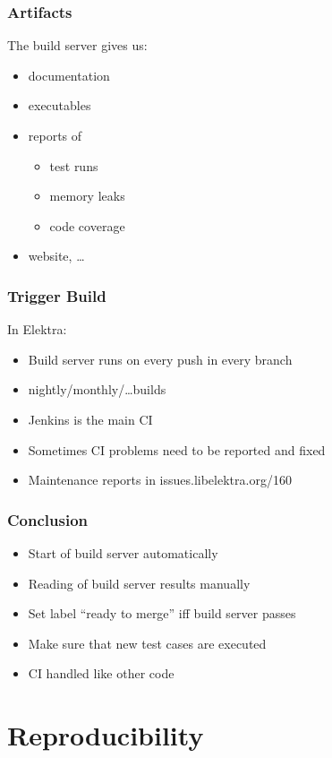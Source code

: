 \begin{frame}
	\frametitle{Artifacts}

	The build server gives us:

	\begin{itemize}[<+-| alert@+>]
	\item documentation
	\item executables
	\item reports of
	\begin{itemize}
	\item test runs
	\item memory leaks
	\item code coverage
	\end{itemize}
	\item website, \dots
	\end{itemize}
\end{frame}

\begin{frame}
	\frametitle{Trigger Build}

	In Elektra:
	\begin{itemize}[<+-| alert@+>]
	\item Build server runs on every push in every branch
	\item nightly/monthly/\dots builds
	\item Jenkins is the main CI
	\item Sometimes CI problems need to be reported and fixed
	\item Maintenance reports in issues.libelektra.org/160
	\end{itemize}
\end{frame}

\begin{frame}
	\frametitle{Conclusion}

	\begin{itemize}[<+-| alert@+>]
	\item Start of build server automatically
	\item Reading of build server results manually
	\item Set label ``ready to merge'' iff build server passes
	\item Make sure that new test cases are executed
	\item CI handled like other code
	\end{itemize}
\end{frame}

\section{Reproducibility}

